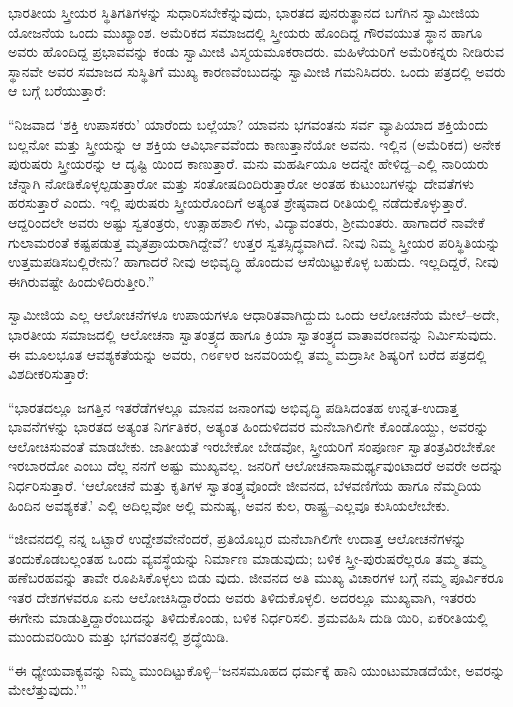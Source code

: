ಭಾರತೀಯ ಸ್ತ್ರೀಯರ ಸ್ಥಿತಿಗತಿಗಳನ್ನು ಸುಧಾರಿಸಬೇಕೆನ್ನುವುದು, ಭಾರತದ ಪುನರುತ್ಥಾನದ ಬಗೆಗಿನ ಸ್ವಾಮೀಜಿಯ ಯೋಜನೆಯ ಒಂದು ಮುಖ್ಯಾಂಶ. ಅಮೆರಿಕದ ಸಮಾಜದಲ್ಲಿ ಸ್ತ್ರೀಯರು ಹೊಂದಿದ್ದ ಗೌರವಯುತ ಸ್ಥಾನ ಹಾಗೂ ಅವರು ಹೊಂದಿದ್ದ ಪ್ರಭಾವವನ್ನು ಕಂಡು ಸ್ವಾಮೀಜಿ ವಿಸ್ಮಯಮೂಕರಾದರು. ಮಹಿಳೆಯರಿಗೆ ಅಮೆರಿಕನ್ನರು ನೀಡಿರುವ ಸ್ಥಾನವೇ ಅವರ ಸಮಾಜದ ಸುಸ್ಥಿತಿಗೆ ಮುಖ್ಯ ಕಾರಣವೆಂಬುದನ್ನು ಸ್ವಾಮೀಜಿ ಗಮನಿಸಿದರು. ಒಂದು ಪತ್ರದಲ್ಲಿ ಅವರು ಆ ಬಗ್ಗೆ ಬರೆಯುತ್ತಾರೆ:

“ನಿಜವಾದ ‘ಶಕ್ತಿ ಉಪಾಸಕರು’ ಯಾರೆಂದು ಬಲ್ಲೆಯಾ? ಯಾವನು ಭಗವಂತನು ಸರ್ವ ವ್ಯಾಪಿಯಾದ ಶಕ್ತಿಯೆಂದು ಬಲ್ಲನೋ ಮತ್ತು ಸ್ತ್ರೀಯನ್ನು ಆ ಶಕ್ತಿಯ ಆವಿರ್ಭಾವವೆಂದು ಕಾಣುತ್ತಾನೆಯೋ ಅವನು. ಇಲ್ಲಿನ (ಅಮೆರಿಕದ) ಅನೇಕ ಪುರುಷರು ಸ್ತ್ರೀಯರನ್ನು ಆ ದೃಷ್ಟಿ ಯಿಂದ ಕಾಣುತ್ತಾರೆ. ಮನು ಮಹರ್ಷಿಯೂ ಅದನ್ನೇ ಹೇಳಿದ್ದ–ಎಲ್ಲಿ ನಾರಿಯರು ಚೆನ್ನಾಗಿ ನೋಡಿಕೊಳ್ಳಲ್ಪಡುತ್ತಾರೋ ಮತ್ತು ಸಂತೋಷದಿಂದಿರುತ್ತಾರೋ ಅಂತಹ ಕುಟುಂಬಗಳನ್ನು ದೇವತೆಗಳು ಹರಸುತ್ತಾರೆ ಎಂದು. ಇಲ್ಲಿ ಪುರುಷರು ಸ್ತ್ರೀಯರೊಂದಿಗೆ ಅತ್ಯಂತ ಶ್ರೇಷ್ಠವಾದ ರೀತಿಯಲ್ಲಿ ನಡೆದುಕೊಳ್ಳುತ್ತಾರೆ. ಆದ್ದರಿಂದಲೇ ಅವರು ಅಷ್ಟು ಸ್ವತಂತ್ರರು, ಉತ್ಸಾಹಶಾಲಿ ಗಳು, ವಿದ್ಯಾವಂತರು, ಶ್ರೀಮಂತರು. ಹಾಗಾದರೆ ನಾವೇಕೆ ಗುಲಾಮರಂತೆ ಕಷ್ಟಪಡುತ್ತ ಮೃತಪ್ರಾಯರಾಗಿದ್ದೇವೆ? ಉತ್ತರ ಸ್ವತಸ್ಸಿದ್ಧವಾಗಿದೆ. ನೀವು ನಿಮ್ಮ ಸ್ತ್ರೀಯರ ಪರಿಸ್ಥಿತಿಯನ್ನು ಉತ್ತಮಪಡಿಸಬಲ್ಲಿರೇನು? ಹಾಗಾದರೆ ನೀವು ಅಭಿವೃದ್ಧಿ ಹೊಂದುವ ಆಸೆಯಿಟ್ಟುಕೊಳ್ಳ ಬಹುದು. ಇಲ್ಲದಿದ್ದರೆ, ನೀವು ಈಗಿರುವಷ್ಟೇ ಹಿಂದುಳಿದಿರುತ್ತೀರಿ.”

ಸ್ವಾಮೀಜಿಯ ಎಲ್ಲ ಆಲೋಚನೆಗಳೂ ಉಪಾಯಗಳೂ ಆಧಾರಿತವಾಗಿದ್ದುದು ಒಂದು ಆಲೋಚನೆಯ ಮೇಲೆ–ಅದೇ, ಭಾರತೀಯ ಸಮಾಜದಲ್ಲಿ ಆಲೋಚನಾ ಸ್ವಾತಂತ್ರ್ಯದ ಹಾಗೂ ಕ್ರಿಯಾ ಸ್ವಾತಂತ್ರ್ಯದ ವಾತಾವರಣವನ್ನು ನಿರ್ಮಿಸುವುದು. ಈ ಮೂಲಭೂತ ಆವಶ್ಯಕತೆಯನ್ನು ಅವರು, ೧೮೯೪ರ ಜನವರಿಯಲ್ಲಿ ತಮ್ಮ ಮದ್ರಾಸೀ ಶಿಷ್ಯರಿಗೆ ಬರೆದ ಪತ್ರದಲ್ಲಿ ವಿಶದೀಕರಿಸುತ್ತಾರೆ:

“ಭಾರತದಲ್ಲೂ ಜಗತ್ತಿನ ಇತರೆಡೆಗಳಲ್ಲೂ ಮಾನವ ಜನಾಂಗವು ಅಭಿವೃದ್ಧಿ ಪಡಿಸಿದಂತಹ ಉನ್ನತ-ಉದಾತ್ತ ಭಾವನೆಗಳನ್ನು ಭಾರತದ ಅತ್ಯಂತ ನಿರ್ಗತಿಕರ, ಅತ್ಯಂತ ಹಿಂದುಳಿದವರ ಮನೆಬಾಗಿಲಿಗೇ ಕೊಂಡೊಯ್ದು, ಅವರನ್ನು ಆಲೋಚಿಸುವಂತೆ ಮಾಡಬೇಕು. ಜಾತೀಯತೆ ಇರಬೇಕೋ ಬೇಡವೋ, ಸ್ತ್ರೀಯರಿಗೆ ಸಂಪೂರ್ಣ ಸ್ವಾತಂತ್ರವಿರಬೇಕೋ ಇರಬಾರದೋ ಎಂಬು ದೆಲ್ಲ ನನಗೆ ಅಷ್ಟು ಮುಖ್ಯವಲ್ಲ. ಜನರಿಗೆ ಆಲೋಚನಾಸಾಮರ್ಥ್ಯವುಂಟಾದರೆ ಅವರೇ ಅದನ್ನು ನಿರ್ಧರಿಸುತ್ತಾರೆ. ‘ಆಲೋಚನೆ ಮತ್ತು ಕೃತಿಗಳ ಸ್ವಾತಂತ್ರ್ಯವೊಂದೇ ಜೀವನದ, ಬೆಳವಣಿಗೆಯ ಹಾಗೂ ನೆಮ್ಮದಿಯ ಹಿಂದಿನ ಅವಶ್ಯಕತೆ.’ ಎಲ್ಲಿ ಅದಿಲ್ಲವೋ ಅಲ್ಲಿ ಮನುಷ್ಯ, ಅವನ ಕುಲ, ರಾಷ್ಟ್ರ–ಎಲ್ಲವೂ ಕುಸಿಯಲೇಬೇಕು.

“ಜೀವನದಲ್ಲಿ ನನ್ನ ಒಟ್ಟಾರೆ ಉದ್ದೇಶವೇನೆಂದರೆ, ಪ್ರತಿಯೊಬ್ಬರ ಮನೆಬಾಗಿಲಿಗೇ ಉದಾತ್ತ ಆಲೋಚನೆಗಳನ್ನು ತಂದುಕೊಡಬಲ್ಲಂತಹ ಒಂದು ವ್ಯವಸ್ಥೆಯನ್ನು ನಿರ್ಮಾಣ ಮಾಡುವುದು; ಬಳಿಕ ಸ್ತ್ರೀ-ಪುರುಷರೆಲ್ಲರೂ ತಮ್ಮ ತಮ್ಮ ಹಣೆಬರಹವನ್ನು ತಾವೇ ರೂಪಿಸಿಕೊಳ್ಳಲು ಬಿಡು ವುದು. ಜೀವನದ ಅತಿ ಮುಖ್ಯ ವಿಚಾರಗಳ ಬಗ್ಗೆ ನಮ್ಮ ಪೂರ್ವಿಕರೂ ಇತರ ದೇಶಗಳವರೂ ಏನು ಆಲೋಚಿಸಿದ್ದಾರೆಂದು ಅವರು ತಿಳಿದುಕೊಳ್ಳಲಿ. ಅದರಲ್ಲೂ ಮುಖ್ಯವಾಗಿ, ಇತರರು ಈಗೇನು ಮಾಡುತ್ತಿದ್ದಾರೆಂಬುದನ್ನು ತಿಳಿದುಕೊಂಡು, ಬಳಿಕ ನಿರ್ಧರಿಸಲಿ. ಶ್ರಮವಹಿಸಿ ದುಡಿ ಯಿರಿ, ಏಕರೀತಿಯಲ್ಲಿ ಮುಂದುವರಿಯಿರಿ ಮತ್ತು ಭಗವಂತನಲ್ಲಿ ಶ್ರದ್ಧೆಯಿಡಿ.

“ಈ ಧ್ಯೇಯವಾಕ್ಯವನ್ನು ನಿಮ್ಮ ಮುಂದಿಟ್ಟುಕೊಳ್ಳಿ–‘ಜನಸಮೂಹದ ಧರ್ಮಕ್ಕೆ ಹಾನಿ ಯುಂಟುಮಾಡದೆಯೇ, ಅವರನ್ನು ಮೇಲೆತ್ತುವುದು.’”

